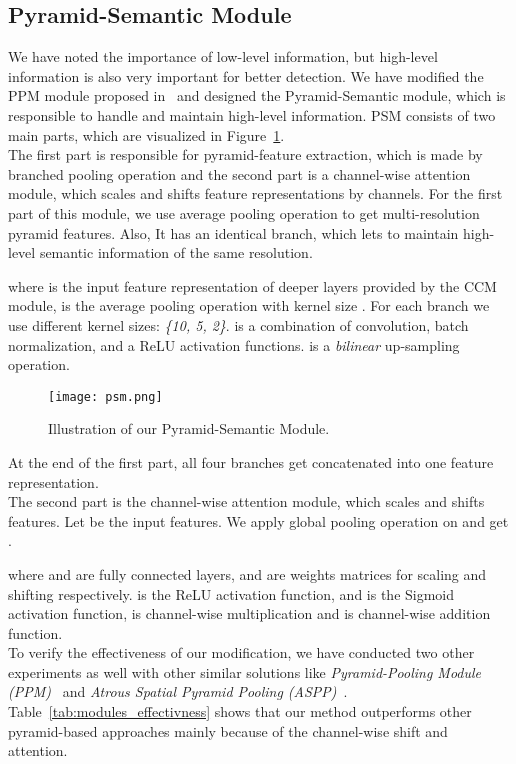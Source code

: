 \documentclass[10pt,twocolumn,letterpaper]{article}
\begin{document}
\subsection{Pyramid-Semantic Module}
We have noted the importance of low-level information, but high-level information is also very important for better detection. We have modified the PPM module proposed in~\cite{PoolNet} and designed the Pyramid-Semantic module, which is responsible to handle and maintain high-level information. PSM consists of two main parts, which are visualized in Figure~\ref{fig:psm}. \\
The first part is responsible for pyramid-feature extraction, which is made by branched pooling operation and the second part is a channel-wise attention module, which scales and shifts feature representations by channels.
For the first part of this module, we use average pooling operation to get multi-resolution pyramid features. Also, It has an identical branch, which lets to maintain high-level semantic information of the same resolution.

where  is the input feature representation of deeper layers provided by the CCM module,  is the average pooling operation with kernel size . For each branch  we use different kernel sizes: \textit{\{10, 5, 2\}}.  is a combination of convolution, batch normalization, and a ReLU activation functions.  is a \textit{bilinear} up-sampling operation.

\begin{figure}[t]
\begin{center}
\texttt{[image: psm.png]}
\end{center}
    \caption{Illustration of our Pyramid-Semantic Module.}
\label{fig:psm}
\end{figure}
At the end of the first part, all four branches get concatenated into one feature representation.\\
The second part is the channel-wise attention module, which scales and shifts features. Let  be the input features. We apply global pooling operation on  and get .




where  and  are fully connected layers,  and  are weights matrices for scaling and shifting respectively.  is the ReLU activation function, and  is the Sigmoid activation function,  is channel-wise multiplication and  is channel-wise addition function. \\
To verify the effectiveness of our modification, we have conducted two other experiments as well with other similar solutions like \textit{Pyramid-Pooling Module (PPM)}~\cite{PoolNet} and \textit{Atrous Spatial Pyramid Pooling (ASPP)}~\cite{DeepLab_ASPP}. Table~\ref{tab:modules_effectivness} shows that our method outperforms other pyramid-based approaches mainly because of the channel-wise shift and attention.
\end{document}
